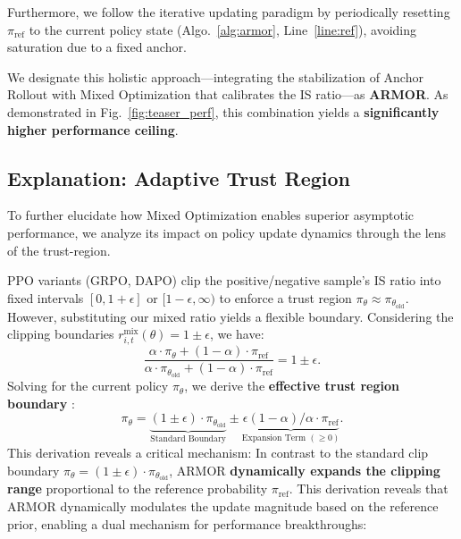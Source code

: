 Furthermore, we follow the iterative updating paradigm \citep{Deepseek-R1} by periodically resetting $\pi_\text{ref}$ to the current policy state (Algo.~\ref{alg:armor}, Line~\ref{line:ref}), avoiding saturation due to a fixed anchor.


We designate this holistic approach---integrating the stabilization of Anchor Rollout with Mixed Optimization that calibrates the IS ratio---as \textbf{ARMOR}. 
As demonstrated in Fig.~\ref{fig:teaser_perf}, this combination yields a \textbf{significantly higher performance ceiling}.

\subsection{Explanation: Adaptive Trust Region}\label{sec:theory}
To further elucidate how Mixed Optimization enables superior asymptotic performance, we analyze its impact on policy update dynamics through the lens of the trust-region.

PPO variants (\eg GRPO, DAPO) clip the positive/negative sample's IS ratio into fixed intervals $[0, 1+\epsilon]$ or $[1-\epsilon,\infty)$ to enforce a trust region $\pi_\theta \approx \pi_{\theta_\text{old}}$. 
However, substituting our mixed ratio yields a flexible boundary.
Considering the clipping boundaries $r_{i,t}^\text{mix}(\theta) = 1 \pm \epsilon$, we have:
$$
\frac{\alpha\cdot\pi_\theta + (1-\alpha)\cdot\pi_{\text{ref}}}{\alpha\cdot\pi_{\theta_{\text{old}}} + (1-\alpha)\cdot\pi_{\text{ref}}} = 1 \pm \epsilon.
$$
Solving for the current policy $\pi_\theta$, we derive the \textbf{effective trust region boundary} \citep{TRPO,PPO}:
\begin{equation}\label{eqn:clip_expand}
\pi_\theta = \underbrace{(1 \pm \epsilon)
\cdot\pi_{\theta_{\text{old}}}}_{\text{Standard Boundary}} \pm \underbrace{\epsilon (1-\alpha)/{\alpha}\cdot\pi_{\text{ref}}}_{\text{Expansion Term }(\ge 0)}.
\end{equation}
This derivation reveals a critical mechanism: In contrast to the standard clip boundary $\pi_\theta =(1 \pm \epsilon)\cdot\pi_{\theta_{\text{old}}}$, ARMOR \textbf{dynamically expands the clipping range} proportional to the reference probability $\pi_{\text{ref}}$.
This derivation reveals that ARMOR dynamically modulates the update magnitude based on the reference prior, enabling a dual mechanism for performance breakthroughs:

